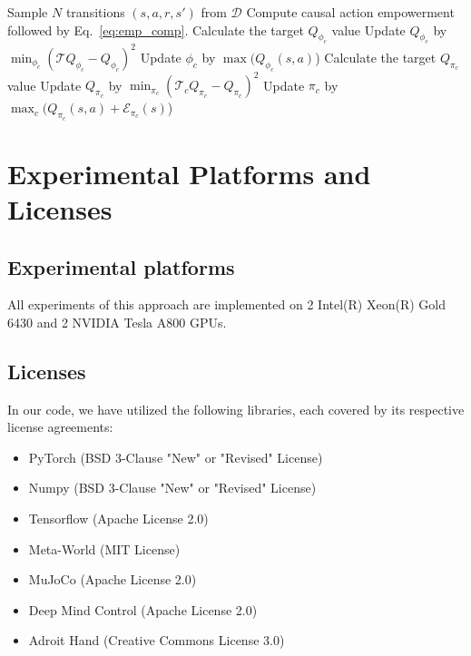 \begin{algorithm}[h]
\begin{algorithmic}[]
      \begin{tcolorbox}[colback=green!0!white,colframe=green!50!black,title=Step 3: Policy optimization with causal action empowerment]
     \STATE Sample $N$ transitions $(s,a,r,s')$ from $\mathcal{D}$
     \STATE Compute causal action empowerment followed by Eq.~\ref{eq:emp_comp}.
     \STATE Calculate the target $Q_{\phi_c}$ value
     \STATE Update $Q_{\phi_c}$ by $\min_{\phi_c}(\mathcal{T}Q_{\phi_c}-Q_{\phi_c})^2$
     \STATE Update $\phi_{c}$ by $\max(Q_{\phi_c}(s,a)$)
     \STATE Calculate the target $Q_{\pi_c}$ value
     \STATE Update $Q_{\pi_c}$ by $\min_{\pi_c}(\mathcal{T}_cQ_{\pi_c}-Q_{\pi_c})^2$
     \STATE Update $\pi_{c}$ by $\max_{c}(Q_{\pi_c}(s,a) + \mathcal{E}_{\pi_c}(s)$)
     \ENDFOR
     \end{tcolorbox}
    \end{algorithmic} 
\end{algorithm}

\section{Experimental Platforms and Licenses}
\label{exp}
\subsection{Experimental platforms}
All experiments of this approach are implemented on 2 Intel(R) Xeon(R) Gold 6430 and 2 NVIDIA Tesla A800 GPUs.

\subsection{Licenses}
In our code, we have utilized the following libraries, each covered by its respective license agreements:
\begin{itemize}
    \item PyTorch (BSD 3-Clause "New" or "Revised" License)
    \item Numpy (BSD 3-Clause "New" or "Revised" License)
    \item Tensorflow (Apache License 2.0)
    \item Meta-World (MIT License)
    \item MuJoCo (Apache License 2.0)
    \item Deep Mind Control (Apache License 2.0)
    \item Adroit Hand (Creative Commons License 3.0)
\end{itemize}


